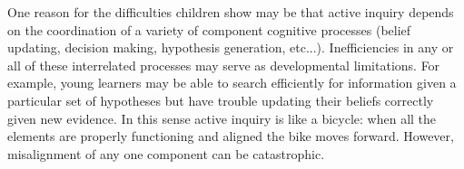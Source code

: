 \documentclass[10pt,letterpaper]{article}
\begin{document}
One reason for the difficulties children show may be that 
active inquiry depends on the coordination of a variety of 
component cognitive processes (belief updating, decision making, hypothesis generation, etc...).  
Inefficiencies in any or all of these interrelated processes may serve as developmental limitations.  
For example, young learners may be able to search efficiently for information given a particular 
set of hypotheses but have trouble updating their beliefs correctly given new evidence.
In this sense active inquiry is like a bicycle: when all the elements are properly functioning
and aligned the bike moves forward.  However, misalignment of any one component can
be catastrophic.

%





%
\end{document}
